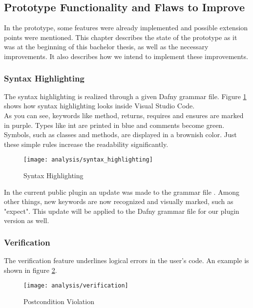 \subsection{Prototype Functionality and Flaws to Improve}
\label{section:analysis:features}
In the prototype, some features were already implemented and possible extension points were mentioned.
This chapter describes the state of the prototype as it was at the beginning of this bachelor thesis, as well as the necessary improvements.
It also describes how we intend to implement these improvements.

\subsubsection{Syntax Highlighting}
The syntax highlighting is realized through a given Dafny grammar file.
Figure \ref{fig:analysis_syntax_highlighting} shows how syntax highlighting looks inside Visual Studio Code. \\

As you can see, keywords like method, returns, requires and ensures are marked in purple.
Types like int are printed in blue and comments become green.
Symbols, such as classes and methods, are displayed in a brownish color.
Just these simple rules increase the readability significantly.

\begin{figure}[H]
    \centering
    \texttt{[image: analysis/syntax\_highlighting]}
    \caption{Syntax Highlighting}
    \label{fig:analysis_syntax_highlighting}
\end{figure}

In the current public plugin an update was made to the grammar file \cite{syntax_update}.
Among other things, new keywords are now recognized and visually marked, such as "expect".
This update will be applied to the Dafny grammar file for our plugin version as well.

\subsubsection{Verification}
The verification feature underlines logical errors in the user's code.
An example is shown in figure \ref{fig:analysis_verification}.

\begin{figure}[H]
    \centering
    \texttt{[image: analysis/verification]}
    \caption{Postcondition Violation}
    \label{fig:analysis_verification}
\end{figure}

